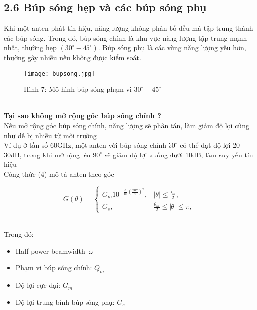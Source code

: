 \documentclass[a4paper,13pt]{article}
\begin{document}
\subsection{2.6 Búp sóng hẹp và các búp sóng phụ}
Khi một anten phát tín hiệu, năng lượng không phân bố đều mà tập trung thành các búp sóng. Trong đó, búp sóng chính là khu vực năng lượng tập trung mạnh nhất, thường hẹp \( (30^\circ - 45^\circ) \). Búp sóng phụ là các vùng năng lượng yếu hơn, thường gây nhiễu nếu không được kiểm soát.

\begin{figure}[htbp]
    \centering
    \texttt{[image: bupsong.jpg]}
    \caption*{Hình 7: Mô hình búp sóng phạm vi \( 30^\circ - 45^\circ \)  \cite{key2} }
    \label{fig:model}
\end{figure}\\
\textbf{Tại sao không mở rộng góc búp sóng chính ?}\\
Nếu mở rộng góc búp sóng chính, năng lượng sẽ phân tán, làm giảm độ lợi cũng như dễ bị nhiễu từ môi trường \\
Ví dụ ở tần số 60GHz, một anten với búp sóng chính \( 30^\circ \) có thể đạt độ lợi 20-30dB, trong khi mở rộng lên \( 90^\circ \) sẽ giảm độ lợi xuống dưới 10dB, làm suy yếu tín hiệu\\
Công thức (4) mô tả anten theo góc {\theta} \\
\begin{center}
\begin{equation}
G(\theta) = 
\begin{cases} 
G_m 10^{-\frac{3}{10} \left(\frac{20\theta}{\omega}\right)^2}, & |\theta| \leq \frac{\theta_m}{2}, \\
G_s, & \frac{\theta_m}{2} \leq |\theta| \leq \pi,
\end{cases} \tag{4}
\end{equation}
\end{center}\\
Trong đó: \\
\begin{itemize}
    \item Half-power beamwidth: \( \omega \)
    \item Phạm vi búp sóng chính: \( Q_m \)
    \item Độ lợi cực đại: \( G_m \)
    \item Độ lợi trung bình búp sóng phụ: \( G_s \)
\end{itemize}
\end{document}
